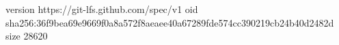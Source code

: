 version https://git-lfs.github.com/spec/v1
oid sha256:36f9bea69e9669f0a8a572f8aeaee40a67289fde574cc390219cb24b40d2482d
size 28620
